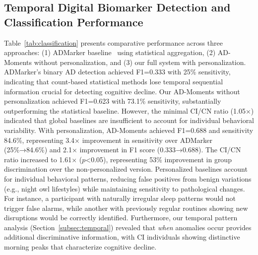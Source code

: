 \documentclass[sigconf, anonymous, 9pt, nonacm]{acmart}
\newcommand{\sys}{AD-Moments\xspace}
\begin{document}
\subsection{Temporal Digital Biomarker Detection and Classification Performance}

Table~\ref{tab:classification} presents comparative performance across three approaches: (1) ADMarker baseline~\cite{ouyang2024ADMarker} using statistical aggregation, (2) \sys without personalization, and (3) our full system with personalization.
ADMarker's binary AD detection achieved F1=0.333 with 25\% sensitivity, indicating that count-based statistical methods lose temporal sequential information crucial for detecting cognitive decline. 
Our \sys without personalization achieved F1=0.623 with 73.1\% sensitivity, substantially outperforming the statistical baseline. However, the minimal CI/CN ratio (1.05×) indicated that global baselines are insufficient to account for individual behavioral variability.
With personalization, \sys achieved F1=0.688 and sensitivity 84.6\%, representing 3.4× improvement in sensitivity over ADMarker (25\%→84.6\%) and 2.1× improvement in F1 score (0.333→0.688). The CI/CN ratio increased to 1.61× ($p$<0.05), representing 53\% improvement in group discrimination over the non-personalized version. Personalized baselines account for individual behavioral patterns, reducing false positives from benign variations (e.g., night owl lifestyles) while maintaining sensitivity to pathological changes. For instance, a participant with naturally irregular sleep patterns would not trigger false alarms, while another with previously regular routines showing new disruptions would be correctly identified. Furthermore, our temporal pattern analysis (Section~\ref{subsec:temporal}) revealed that \emph{when} anomalies occur provides additional discriminative information, with CI individuals showing distinctive morning peaks that characterize cognitive decline.
\end{document}

